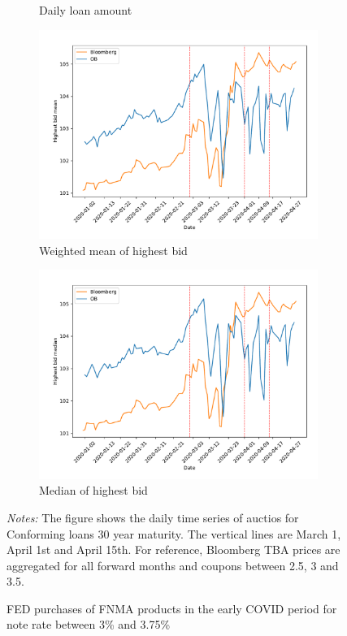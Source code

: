 \documentclass[11pt,a4paper]{article}
\begin{document}
\begin{figure}[h]
\begin{subfigure}[b]{0.49\textwidth}
      \caption{ Daily loan amount}
     \end{subfigure}
     \begin{subfigure}[b]{0.49\textwidth}
      \includegraphics[width=0.998\textwidth]{../results/figures/w_winner_bid_mean_mat30_loan1_timeseries_nr_3_3.75.pdf}
      \caption{ Weighted mean of highest bid}
     \end{subfigure}
     \begin{subfigure}[b]{0.49\textwidth}
      \includegraphics[width=0.998\textwidth]{../results/figures/winner_bid_median_mat30_loan1_timeseries_nr_3_3.75.pdf}
      \caption{ Median of highest bid}
     \end{subfigure}
   \caption{FED purchases of FNMA products in the early COVID period for note rate between 3\% and 3.75\%}
   \begin{minipage}{\textwidth}
      \footnotesize{\textit{Notes:} The figure shows the daily time series of auctios for Conforming loans 30 year maturity. The vertical lines are March 1, April 1st and April 15th. For reference, Bloomberg TBA prices are aggregated for all forward months and coupons between 2.5, 3 and 3.5. } 
      \end{minipage}
\end{figure}
\end{document}
